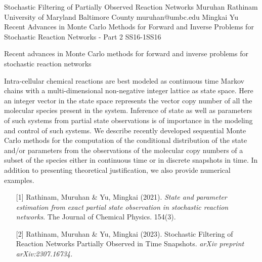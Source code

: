 \begin{talk}
  {Stochastic Filtering of Partially Observed Reaction Networks}%
  {Muruhan Rathinam}%
  {University of Maryland Baltimore County}%
  {muruhan@umbc.edu}%
  {Mingkai Yu}
{Recent Advances in Monte Carlo Methods for Forward and Inverse Problems for Stochastic Reaction Networks - Part 2}
{}{SS16-1}{SS16}

  {Recent advances in Monte Carlo methods for forward and inverse problems for stochastic reaction networks}%
			
Intra-cellular chemical reactions are best modeled as continuous time Markov chains
with a multi-dimensional non-negative integer lattice as state space. Here an
integer vector in the state space represents the vector copy number of all the 
molecular species present in the system. Inference of
state as well as parameters of such systems from partial state observations is of 
importance in the modeling and control of such systems. We describe recently developed
sequential Monte Carlo methods for the computation of the conditional distribution 
of the state and/or parameters from the observations of the molecular copy numbers of a subset of the 
species either in continuous time or in discrete snapshots in time. In addition to presenting theoretical justification, we also provide numerical examples. 
\medskip

\begin{enumerate}
	\item[{[1]}] Rathinam, Muruhan \& Yu, Mingkai (2021). {\it State and parameter estimation from exact partial state observation in stochastic reaction networks}. The Journal of Chemical Physics. 
 154(3).
	\item[{[2]}] Rathinam, Muruhan \& Yu, Mingkai (2023). Stochastic Filtering of Reaction Networks Partially Observed in Time Snapshots. {\it arXiv preprint arXiv:2307.16734.}
\end{enumerate}

\end{talk}

